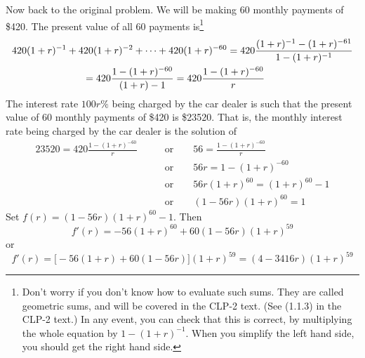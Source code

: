 \begin{eg}
Now back to the original problem. We will be making 60 monthly payments of 
\$420. The present value of all 60 payments is\footnote{Don't worry if you don't
know how to evaluate such sums. They are called geometric sums, and will be covered in the CLP-2 text. (See (1.1.3) in the CLP-2 text.) In any event,
you can check that this is correct, by multiplying the whole equation by $1-(1+r)^{-1}$. When you simplify the left hand side, you should get the 
right hand side.}
\begin{align*}
&420(1+r)^{-1}+420(1+r)^{-2}+\cdots +420(1+r)^{-60} 
   =420\frac{(1+r)^{-1}-(1+r)^{-61} }{1-(1+r)^{-1} } \\
&\hskip1in=420\frac{1-(1+r)^{-60} }{(1+r)-1}
=420\frac{1-(1+r)^{-60} }{r}
\end{align*}
The interest rate $100r\%$ being charged by the car dealer is such that 
the present value of 60 monthly payments of \$420 is \$23520. 
 That is, the monthly interest rate being charged by the car dealer 
is the solution of
\begin{align*}
 23520=420\frac{1-(1+r)^{-60} }{r} 
\qquad&\text{or}\qquad 
56=\frac{1-(1+r)^{-60} }{r} \\
&\text{or}\qquad 
56r=1-(1+r)^{-60} \\
&\text{or}\qquad 
56r(1+r)^{60}=(1+r)^{60}-1 \\
&\text{or}\qquad 
(1-56r)(1+r)^{60}=1
\end{align*}
Set $f(r)=(1-56r)(1+r)^{60}-1$. Then 
\begin{equation*}
f'(r)=-56(1+r)^{60}+60(1-56r)(1+r)^{59}
\end{equation*}
or 
\begin{equation*}
f'(r)=\big[-56(1+r)+60(1-56r)\big](1+r)^{59}
     =(4-3416r)(1+r)^{59}
\end{equation*} 

\end{eg}
